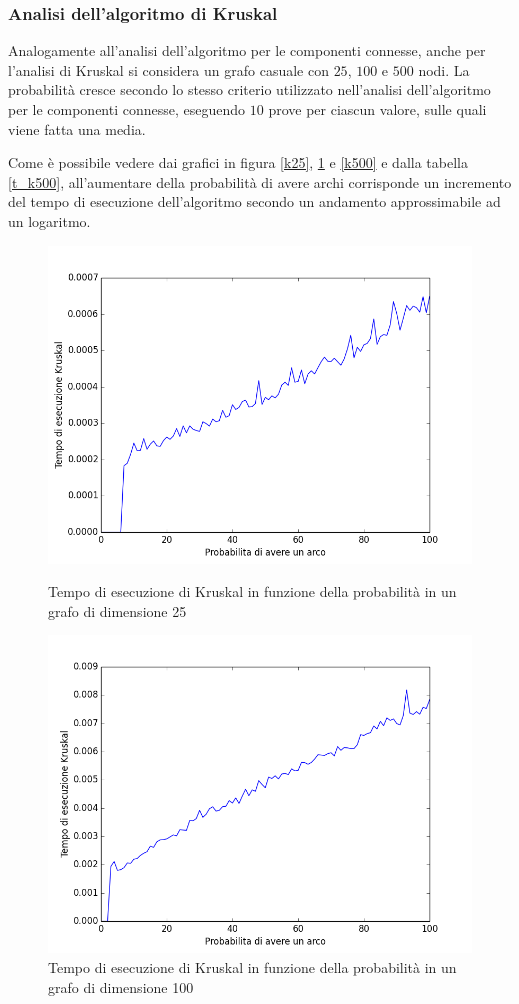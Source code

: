\documentclass[11pt]{article}
\begin{document}
\subsubsection{Analisi dell'algoritmo di Kruskal}
Analogamente all'analisi dell'algoritmo per le componenti connesse, anche per l'analisi di Kruskal si considera un grafo casuale con $25$, $100$ e $500$ nodi. La probabilità cresce secondo lo stesso criterio utilizzato nell'analisi dell'algoritmo per le componenti connesse, eseguendo $10$ prove per ciascun valore, sulle quali viene fatta una media.

Come è possibile vedere dai grafici in figura \ref{k25}, \ref{k100} e \ref{k500} e dalla tabella \ref{t_k500}, all'aumentare della probabilità di avere archi corrisponde un incremento del tempo di esecuzione dell'algoritmo secondo un andamento approssimabile ad un logaritmo.
\begin{figure}[h]
\centering
\includegraphics[scale=0.33,angle=0]{kruskal25.png}
\caption{Tempo di esecuzione di Kruskal in funzione della probabilità in un grafo di dimensione 25}
\label{k25}
\includegraphics[scale=0.33,angle=0]{kruskal100.png}
\caption{Tempo di esecuzione di Kruskal in funzione della probabilità in un grafo di dimensione 100}
\label{k100}
\end{figure}
\end{document}
